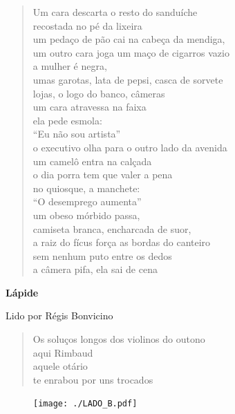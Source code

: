\begin{verse}
Um cara descarta o resto do sanduíche\\
recostada no pé da lixeira\\
um pedaço de pão cai na cabeça da mendiga,\\
um outro cara joga um maço de cigarros vazio\\
a mulher é negra,\\
umas garotas, lata de pepsi, casca de sorvete\\
lojas, o logo do banco, câmeras\\
um cara atravessa na faixa\\
ela pede esmola:\\
``Eu não sou artista''\\
o executivo olha para o outro lado da avenida\\
um camelô entra na calçada\\
o dia porra tem que valer a pena\\
no quiosque, a manchete:\\
``O desemprego aumenta''\\
um obeso mórbido passa,\\
camiseta branca, encharcada de suor,\\
a raiz do fícus força as bordas do canteiro\\
sem nenhum puto entre os dedos\\
a câmera pifa, ela sai de cena
\end{verse}

\pagebreak

\textbf{Lápide}

Lido por Régis Bonvicino

\begin{verse}
Os soluços longos dos violinos do outono\\
aqui Rimbaud\\
aquele otário\\
te enrabou por uns trocados
\end{verse}

\pagebreak
\thispagestyle{empty}

\movetoevenpage
\thispagestyle{empty}

\begin{absolutelynopagebreak}

\begin{vplace}
\begin{figure}[H]
\begin{adjustwidth}{-3.2cm}{}
  \vspace*{8cm}
  \texttt{[image: ./LADO\_B.pdf]}  
\end{adjustwidth}

\end{figure}
\end{vplace}

\end{absolutelynopagebreak}

